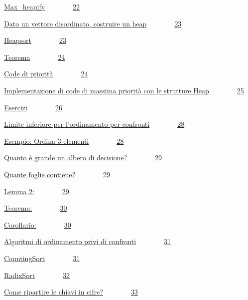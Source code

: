 \documentclass{article}
\begin{document}
{\protect\hyperlink{h.t1rcecigqmbx}{Max\_heapify}}{~~~~~~~~}{\protect\hyperlink{h.t1rcecigqmbx}{22}}

{\protect\hyperlink{h.symae1e4ut5b}{Dato un vettore disordinato,
costruire un heap}}{~~~~~~~~}{\protect\hyperlink{h.symae1e4ut5b}{23}}

{\protect\hyperlink{h.vi4eu8p6i55e}{Heapsort}}{~~~~~~~~}{\protect\hyperlink{h.vi4eu8p6i55e}{23}}

{\protect\hyperlink{h.rdu8s741ww8w}{Teorema}}{~~~~~~~~}{\protect\hyperlink{h.rdu8s741ww8w}{24}}

{\protect\hyperlink{h.jih9riph7gns}{Code di
priorità}}{~~~~~~~~}{\protect\hyperlink{h.jih9riph7gns}{24}}

{\protect\hyperlink{h.aocay3iqens1}{Implementazione di code di massima
priorità con le strutture
Heap}}{~~~~~~~~}{\protect\hyperlink{h.aocay3iqens1}{25}}

{\protect\hyperlink{h.r8bopy9q4g8f}{Esercizi}}{~~~~~~~~}{\protect\hyperlink{h.r8bopy9q4g8f}{26}}

{\protect\hyperlink{h.7gslm72cwwxs}{Limite inferiore per l'ordinamento
per confronti}}{~~~~~~~~}{\protect\hyperlink{h.7gslm72cwwxs}{28}}

{\protect\hyperlink{h.oynrnvh2y1cp}{Esempio: Ordina 3
elementi}}{~~~~~~~~}{\protect\hyperlink{h.oynrnvh2y1cp}{28}}

{\protect\hyperlink{h.prflgx3s7s1g}{Quanto è grande un albero di
decisione?}}{~~~~~~~~}{\protect\hyperlink{h.prflgx3s7s1g}{29}}

{\protect\hyperlink{h.cphw2k3mqktf}{Quante foglie
contiene?}}{~~~~~~~~}{\protect\hyperlink{h.cphw2k3mqktf}{29}}

{\protect\hyperlink{h.yiy1tipj4aof}{Lemma
2:}}{~~~~~~~~}{\protect\hyperlink{h.yiy1tipj4aof}{29}}

{\protect\hyperlink{h.hr66c3ikhdcj}{Teorema:}}{~~~~~~~~}{\protect\hyperlink{h.hr66c3ikhdcj}{30}}

{\protect\hyperlink{h.emyylm3q4aq8}{Corollario:}}{~~~~~~~~}{\protect\hyperlink{h.emyylm3q4aq8}{30}}

{\protect\hyperlink{h.p17586cst16}{Algoritmi di ordinamento privi di
confronti}}{~~~~~~~~}{\protect\hyperlink{h.p17586cst16}{31}}

{\protect\hyperlink{h.bfk18jaq5ar4}{CountingSort}}{~~~~~~~~}{\protect\hyperlink{h.bfk18jaq5ar4}{31}}

{\protect\hyperlink{h.ixohzh3ypk6v}{RadixSort}}{~~~~~~~~}{\protect\hyperlink{h.ixohzh3ypk6v}{32}}

{\protect\hyperlink{h.u6e4yemegdiq}{Come ripartire le chiavi in
cifre?}}{~~~~~~~~}{\protect\hyperlink{h.u6e4yemegdiq}{33}}
\end{document}
